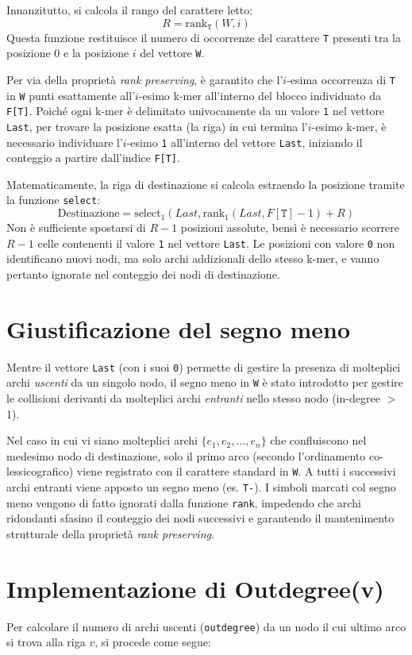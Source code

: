\documentclass[a4paper,11pt]{article}
\begin{document}
Innanzitutto, si calcola il rango del carattere letto:
$$ R = \text{rank}_{\texttt{T}}(W, i) $$
Questa funzione restituisce il numero di occorrenze del carattere \texttt{T} presenti tra la posizione 0 e la posizione $i$ del vettore \texttt{W}. 

Per via della proprietà \textit{rank preserving}, è garantito che l'$i$-esima occorrenza di \texttt{T} in \texttt{W} punti esattamente all'$i$-esimo k-mer all'interno del blocco individuato da \texttt{F[T]}. Poiché ogni k-mer è delimitato univocamente da un valore \texttt{1} nel vettore \texttt{Last}, per trovare la posizione esatta (la riga) in cui termina l'$i$-esimo k-mer, è necessario individuare l'$i$-esimo \texttt{1} all'interno del vettore \texttt{Last}, iniziando il conteggio a partire dall'indice \texttt{F[T]}.

Matematicamente, la riga di destinazione si calcola estraendo la posizione tramite la funzione \texttt{select}:
$$ \text{Destinazione} = \text{select}_1(Last, \text{rank}_1(Last, F[\texttt{T}] - 1) + R) $$
Non è sufficiente spostarsi di $R-1$ posizioni assolute, bensì è necessario scorrere $R-1$ celle contenenti il valore \texttt{1} nel vettore \texttt{Last}. Le posizioni con valore \texttt{0} non identificano nuovi nodi, ma solo archi addizionali dello stesso k-mer, e vanno pertanto ignorate nel conteggio dei nodi di destinazione.

\section{Giustificazione del segno meno}
Mentre il vettore \texttt{Last} (con i suoi \texttt{0}) permette di gestire la presenza di molteplici archi \textit{uscenti} da un singolo nodo, il segno meno in \texttt{W} è stato introdotto per gestire le collisioni derivanti da molteplici archi \textit{entranti} nello stesso nodo (in-degree $>$ 1).

Nel caso in cui vi siano molteplici archi $\{e_1, e_2, \dots, e_n\}$ che confluiscono nel medesimo nodo di destinazione, solo il primo arco (secondo l'ordinamento co-lessicografico) viene registrato con il carattere standard in \texttt{W}. A tutti i successivi archi entranti viene apposto un segno meno (es. \texttt{T-}). 
I simboli marcati col segno meno vengono di fatto ignorati dalla funzione \texttt{rank}, impedendo che archi ridondanti sfasino il conteggio dei nodi successivi e garantendo il mantenimento strutturale della proprietà \textit{rank preserving}.

\section{Implementazione di Outdegree(v)}
Per calcolare il numero di archi uscenti (\texttt{outdegree}) da un nodo il cui ultimo arco si trova alla riga $v$, si procede come segue:
\end{document}
